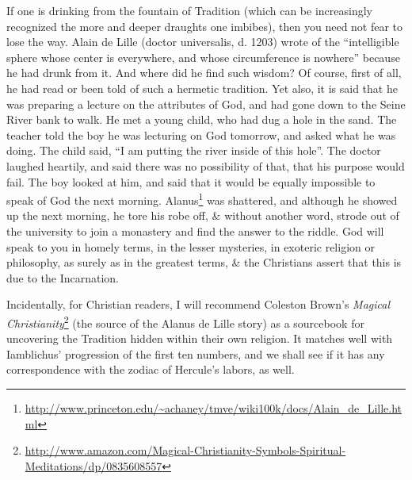 If one is drinking from the fountain of Tradition (which can be increasingly recognized the more and deeper draughts one imbibes), then you need not fear to lose the way. Alain de Lille (doctor universalis, d. 1203) wrote of the ``intelligible sphere whose center is everywhere, and whose circumference is nowhere'' because he had drunk from it. And where did he find such wisdom? Of course, first of all, he had read or been told of such a hermetic tradition. Yet also, it is said that he was preparing a lecture on the attributes of God, and had gone down to the Seine River bank to walk. He met a young child, who had dug a hole in the sand. The teacher told the boy he was lecturing on God tomorrow, and asked what he was doing. The child said, ``I am putting the river inside of this hole''. The doctor laughed heartily, and said there was no possibility of that, that his purpose would fail. The boy looked at him, and said that it would be equally impossible to speak of God the next morning. Alanus\footnote{\url{http://www.princeton.edu/\~achaney/tmve/wiki100k/docs/Alain\_de\_Lille.html}} was shattered, and although he showed up the next morning, he tore his robe off, \& without another word, strode out of the university to join a monastery and find the answer to the riddle. God will speak to you in homely terms, in the lesser mysteries, in exoteric religion or philosophy, as surely as in the greatest terms, \& the Christians assert that this is due to the Incarnation.

Incidentally, for Christian readers, I will recommend Coleston Brown's \emph{Magical Christianity}\footnote{\url{http://www.amazon.com/Magical-Christianity-Symbols-Spiritual-Meditations/dp/0835608557}} (the source of the Alanus de Lille story) as a sourcebook for uncovering the Tradition hidden within their own religion. It matches well with Iamblichus' progression of the first ten numbers, and we shall see if it has any correspondence with the zodiac of Hercule's labors, as well.




